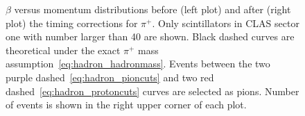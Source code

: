 \begin{figure}[htp]
\begin{center}
\caption{\small  $\beta$ versus momentum distributions before (left plot) and after (right plot) the timing corrections for $\pi^{+}$. Only scintillators in CLAS sector one with number larger than 40 are shown. Black dashed curves are theoretical under the exact $\pi^{+}$ mass assumption~\ref{eq:hadron_hadronmass}. Events between the two purple dashed~\ref{eq:hadron_pioncuts} and two red dashed~\ref{eq:hadron_protoncuts} curves are selected as pions. Number of events is shown in the right upper corner of each plot. \label{fig:b_vs_p_time_corr}} 
\end{center}
\end{figure}

